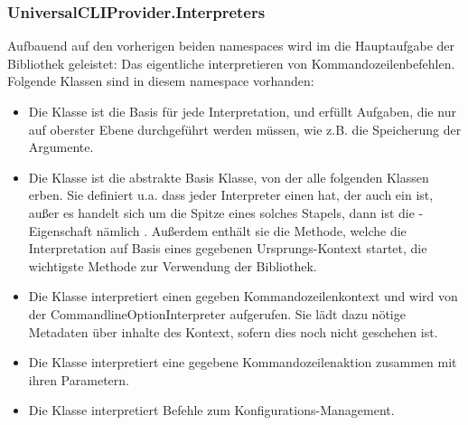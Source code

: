  \subsubsection{UniversalCLIProvider.Interpreters}
 Aufbauend auf den vorherigen beiden namespaces wird im  die Hauptaufgabe der Bibliothek geleistet: 
 Das eigentliche interpretieren von Kommandozeilenbefehlen.
 Folgende Klassen sind in diesem namespace vorhanden:
 \begin{itemize}
  \item Die  Klasse ist die Basis f\"ur jede Interpretation, und erfüllt Aufgaben, die nur auf oberster Ebene durchgeführt werden müssen, wie z.B. die Speicherung der Argumente.
  \item Die  Klasse ist die abstrakte Basis Klasse, von der alle folgenden Klassen erben.
  Sie definiert u.a. dass jeder Interpreter einen  hat, der auch ein  ist, au\ss er es handelt sich um die Spitze eines solches Stapels,
  dann ist die -Eigenschaft nämlich .
  Au\ss erdem enthält sie die  Methode, welche die Interpretation auf Basis eines gegebenen Ursprungs-Kontext startet, die wichtigste Methode zur Verwendung der Bibliothek.
  \item Die  Klasse interpretiert einen gegeben Kommandozeilenkontext und wird von der CommandlineOptionInterpreter aufgerufen.
  Sie lädt dazu nötige Metadaten über inhalte des Kontext, sofern dies noch nicht geschehen ist.
  \item Die  Klasse interpretiert eine gegebene Kommandozeilenaktion zusammen mit ihren Parametern.
  \item Die  Klasse interpretiert Befehle zum Konfigurations-Management.
 \end{itemize}

